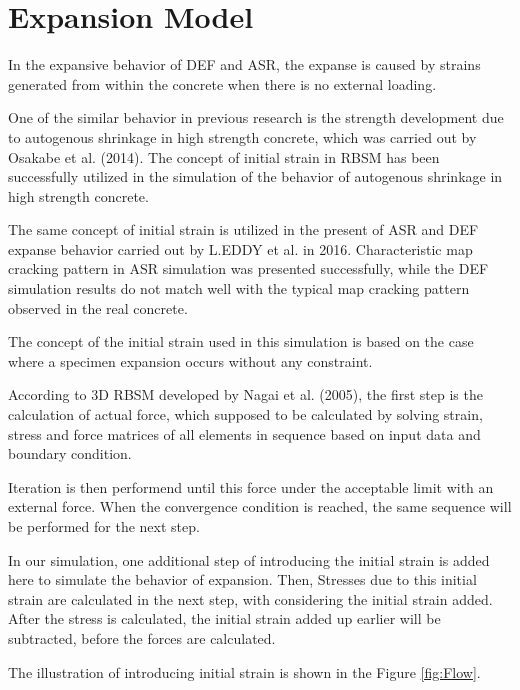 \section{Expansion Model}

In the expansive behavior of DEF and ASR, the expanse is caused by strains generated from within the concrete when there is no external loading.

One of the similar behavior in previous research is the strength development due to autogenous shrinkage in high strength concrete, which was carried out by Osakabe et al. (2014). The concept of initial strain in RBSM has been successfully utilized in the simulation of the behavior of autogenous shrinkage in high strength concrete.

The same concept of initial strain is utilized in the present of ASR and DEF expanse behavior carried out by L.EDDY et al. in 2016. Characteristic map cracking pattern in ASR simulation was presented successfully, while the DEF simulation results do not match well with the typical map cracking pattern observed in the real concrete.

The concept of the initial strain used in this simulation is based on the case where a specimen expansion occurs without any constraint.

According to  3D RBSM developed by Nagai et al. (2005), the first step is the calculation of actual force, which supposed to be calculated by solving strain, stress and force matrices of all elements in sequence based on input data and boundary condition.

Iteration is then performend until this force under the acceptable limit with an external force. When the convergence condition is reached, the same sequence will be performed for the next step.

In our simulation, one additional step of introducing the initial strain is added here to simulate the behavior of expansion.  Then, Stresses due to this initial strain are calculated in the next step, with considering the initial strain added. After the stress is calculated, the initial strain added up earlier will be subtracted, before the forces are calculated.

The illustration of introducing initial strain is shown in the Figure \ref{fig:Flow}.

